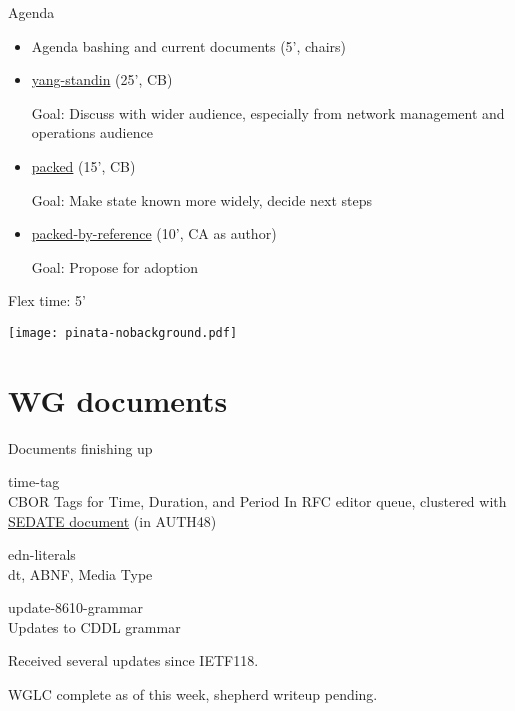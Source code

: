 \documentclass[aspectratio=169]{beamer}
\begin{document}
\begin{frame}{Agenda}\large
    \begin{itemize}
        \item Agenda bashing and current documents (5', chairs)

        \item  \href{https://datatracker.ietf.org/doc/draft-bormann-cbor-yang-standin/}{yang-standin} (25', CB)

            Goal: Discuss with wider audience, especially from network management and operations audience

        \item  \href{https://datatracker.ietf.org/doc/draft-ietf-cbor-packed/}{packed} (15', CB)

            Goal: Make state known more widely, decide next steps
  
        \item  \href{https://datatracker.ietf.org/doc/draft-amsuess-cbor-packed-by-reference/}{packed-by-reference} (10', CA as author)

            Goal: Propose for adoption
    \end{itemize}

    \bigskip

    Flex time: 5'

    \vspace{-3cm}
    \begin{block}{\texttt{[image: pinata-nobackground.pdf]}\mbox{\quad}}
    \end{block}
\end{frame}

\section*{WG documents}

\begin{frame}{Documents finishing up}\large
    \begin{block}{\Large time-tag \\ \small CBOR Tags for Time, Duration, and Period}
        In RFC editor queue, clustered with \href{https://datatracker.ietf.org/doc/draft-ietf-sedate-datetime-extended/}{SEDATE document} (in AUTH48)\
    \end{block}

    \bigskip

    \begin{block}{edn-literals \\ \scriptsize dt\textquotedbl\textquotedbl, ABNF, Media Type

        \normalsize \mbox{update-8610-grammar} \\ \scriptsize Updates to CDDL grammar
        }
        Received several updates since IETF118.

        \medskip

        WGLC complete as of this week, shepherd writeup pending.
    \end{block}

\end{frame}
\end{document}
